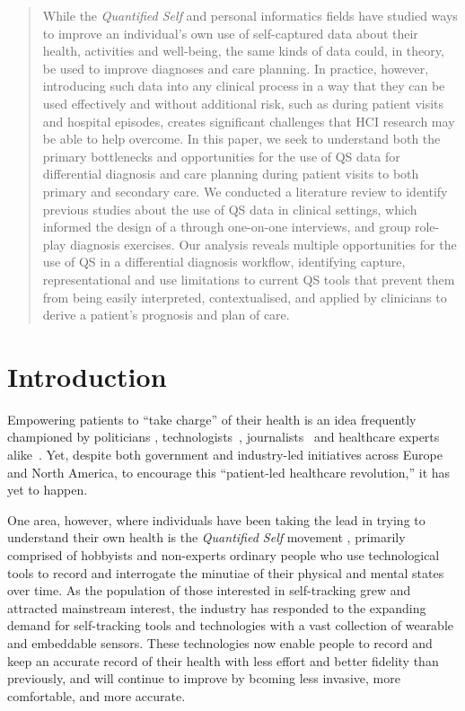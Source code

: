 \documentclass{sigchi}
\begin{document}
\begin{abstract}
While the \emph{Quantified Self} and personal informatics fields have studied ways to improve an individual’s own use of self-captured data about their health, activities and well-being, the same kinds of data could, in theory, be used to improve diagnoses and care planning.  In practice, however, introducing such data into any clinical process in a way that they can be used effectively and without additional risk, such as during patient visits and hospital episodes, creates significant challenges that HCI research may be able to help overcome.  In this paper, we seek to understand both the primary bottlenecks and opportunities for the use of QS data for differential diagnosis and care planning during patient visits to both primary and secondary care. We conducted a literature review to identify previous studies about the use of QS data in clinical settings, which informed the design of a  through one-on-one interviews, and group role-play diagnosis exercises.  Our analysis reveals multiple opportunities for the use of QS in a differential diagnosis workflow, identifying capture, representational and use limitations to current QS tools that prevent them from being easily interpreted, contextualised, and applied by clinicians to derive a patient's prognosis and plan of care.
\end{abstract}


 

\section{Introduction}

Empowering patients to ``take charge'' of their health is an idea frequently championed by politicians \cite{brown, obama}, technologists~\cite{ihealth}, journalists~\cite{goetz} and healthcare experts alike~\cite{swan2012health}.  Yet, despite both government and industry-led initiatives across Europe and North America, to encourage this ``patient-led healthcare revolution,'' it has yet to happen.  

One area, however, where individuals have been taking the lead in trying to understand their own health is the \emph{Quantified Self} movement \cite{}, primarily comprised of hobbyists and non-experts ordinary people who use technological tools to record and interrogate the minutiae of their physical and mental states over time.   As the population of those interested in self-tracking grew and attracted mainstream interest, the industry has responded to the expanding demand for self-tracking tools and technologies with a vast collection of wearable and embeddable sensors.  These technologies now enable people to record and keep an accurate record of their health with less effort and better fidelity than previously, and will continue to improve by bcoming less invasive, more comfortable, and more accurate.
\end{document}
